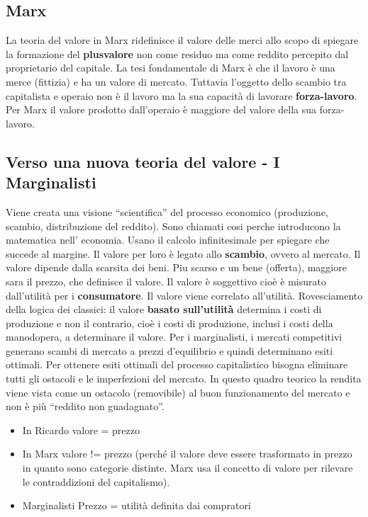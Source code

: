 \documentclass{article}
\begin{document}
\subsection{Marx}
La teoria del valore in Marx ridefinisce il valore delle merci allo scopo di spiegare la
formazione del \textbf{plusvalore} non come residuo ma come reddito percepito dal
proprietario del capitale. La tesi fondamentale di Marx è che il lavoro è una merce
(fittizia) e ha un valore di mercato. Tuttavia l’oggetto dello scambio tra capitalista e
operaio non è il lavoro ma la sua capacità di lavorare \textbf{forza-lavoro}.
Per Marx il valore prodotto dall’operaio è maggiore del valore della sua forza-lavoro. 

\subsection{Verso una nuova teoria del valore - I Marginalisti}
Viene creata una visione “scientifica” del processo economico (produzione, scambio,
distribuzione del reddito).
 Sono chiamati cosi perche introducono la matematica nell' economia. Usano il calcolo infinitesimale per spiegare che succede al margine. Il valore per loro  è
 legato allo \textbf{scambio}, ovvero al mercato. Il valore dipende  dalla scarsita dei beni. Piu scarso e un bene (offerta), maggiore sara il prezzo, che definisce il valore. Il valore è soggettivo cioè è misurato dall’utilità per i \textbf{consumatore}.
Il valore viene correlato all’utilità. Rovesciamento della logica dei classici: il valore \textbf{basato sull’utilità} determina i costi di produzione e non il contrario, cioè i costi di produzione, inclusi i costi della manodopera, a determinare il valore.
Per i marginalisti, i mercati competitivi generano scambi di mercato a prezzi d’equilibrio e
quindi determinano esiti ottimali. Per ottenere esiti ottimali del processo capitalistico bisogna
eliminare tutti gli ostacoli e le imperfezioni del mercato. In questo quadro teorico la rendita
viene vista come un ostacolo (removibile) al buon funzionamento del mercato e non è più
“reddito non guadagnato”. 
\begin{itemize}
    \item In Ricardo valore = prezzo
    \item In Marx valore != prezzo (perché il valore deve essere trasformato in prezzo in quanto sono
categorie distinte. Marx usa il concetto di valore per rilevare le
contraddizioni del capitalismo).
\item Marginalisti Prezzo = utilità definita dai compratori 
\end{itemize}
\end{document}

